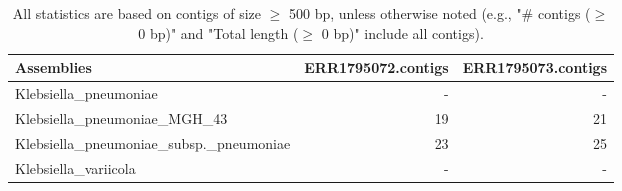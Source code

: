 \documentclass[12pt,a4paper]{article}
\begin{document}
\begin{table}[ht]
\begin{center}
\caption{All statistics are based on contigs of size $\geq$ 500 bp, unless otherwise noted (e.g., "\# contigs ($\geq$ 0 bp)" and "Total length ($\geq$ 0 bp)" include all contigs).}
\begin{tabular}{|l*{2}{|r}|}
\hline
Assemblies & ERR1795072.contigs & ERR1795073.contigs \\ \hline
Klebsiella\_pneumoniae & - & - \\ \hline
Klebsiella\_pneumoniae\_MGH\_43 & 19 & 21 \\ \hline
Klebsiella\_pneumoniae\_subsp.\_pneumoniae & 23 & 25 \\ \hline
Klebsiella\_variicola & - & - \\ \hline
\end{tabular}
\end{center}
\end{table}
\end{document}
